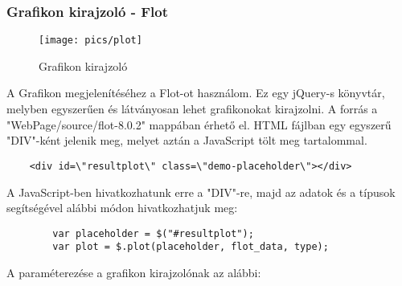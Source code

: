   	\subsubsection{Grafikon kirajzoló - Flot}

	\begin{figure}[h]
	\texttt{[image: pics/plot]}
	\centering
	\caption{Grafikon kirajzoló\label{fig:plot}}

	\end{figure}
		A Grafikon megjelenítéséhez a Flot-ot használom. Ez egy jQuery-s könyvtár, melyben egyszerűen és látványosan lehet grafikonokat kirajzolni. A forrás a "WebPage/source/flot-8.0.2" mappában érhető el.
		HTML fájlban egy egyszerű "DIV"-ként jelenik meg, melyet aztán a JavaScript tölt meg tartalommal.
				\begin{verbatim}
	<div id=\"resultplot\" class=\"demo-placeholder\"></div>
			\end{verbatim}
		A JavaScript-ben hivatkozhatunk erre a "DIV"-re, majd az adatok és a típusok segítségével alábbi módon hivatkozhatjuk meg: 
		\begin{verbatim}
	    var placeholder = $("#resultplot");
	    var plot = $.plot(placeholder, flot_data, type);
		\end{verbatim}
		A paraméterezése a grafikon kirajzolónak az alábbi: 
